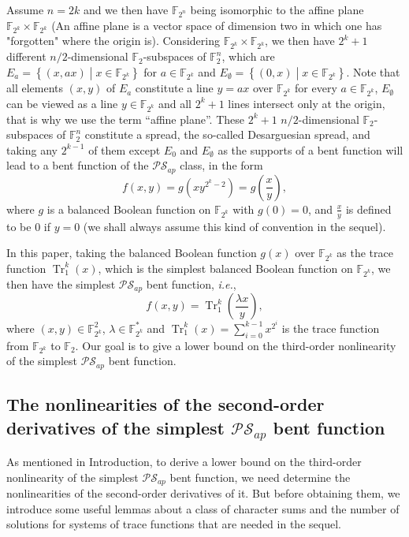 \documentclass{article}
\newcommand{\F}{\mathbb{F}}
\newcommand{\0}{\textbf{0}}
\newcommand{\1}{\textbf{1}}
\newcommand{\TRACE}{\operatorname{Tr}_1^k}
\theoremstyle{plain}
\begin{document}
    Assume $n=2k$ and we then have $\F_{2^n}$ being isomorphic to the affine plane $\F_{2^k}\times\F_{2^k}$ (An affine plane is a vector space of dimension two in which one has "forgotten" where the origin is).
    Considering $\F_{2^k}\times\F_{2^k}$, we then have $2^k+1$ different $n/2$-dimensional $\F_2$-subspaces of $\F_2^n$, which are $E_a=\left\{(x,ax)\middle| x\in\F_{2^k}\right\}$ for $a\in\F_{2^k}$ and $E_{\emptyset}=\left\{(0,x)\middle| x\in\F_{2^k}\right\}$. 
    Note that all elements $(x,y)$ of $E_a$ constitute a line $y=ax$ over $\F_{2^k}$ for every $a\in\F_{2^k}$, $E_{\emptyset}$ can be viewed as a line $y\in\F_{2^k}$ and all $2^k+1$ lines intersect only at the origin, that is why we use the term ``affine plane''. 
    These $2^k+1$ $n/2$-dimensional $\F_2$-subspaces of $\F_2^n$ constitute a spread, the so-called Desarguesian spread, and taking any $2^{k-1}$ of them except $E_0$ and $E_{\emptyset}$ as the supports of a bent function will lead to a bent function of the $\mathcal{PS}_{ap}$ class, in the form 
    \begin{equation*}\label{Eqn_PS_bent}
        f(x,y)=g\left(xy^{2^k-2}\right)=g\left(\frac{x}{y}\right),
    \end{equation*}
    where $g$ is a balanced Boolean function on $\F_{2^{k}}$ with $g(0)=0$, and $\frac{x}{y}$ is defined to be $0$ if $y=0$ (we shall always assume this kind of convention in the sequel).

    In this paper, taking the balanced Boolean function $g(x)$ over $\F_{2^k}$ as the trace function $\TRACE(x)$, which is the simplest balanced Boolean function on $\F_{2^k}$, we then have the simplest 
    $\mathcal{PS}_{ap}$ bent function, \emph{i.e.}, 
    \begin{equation*}\label{sub-bent}
        f(x,y)=\TRACE\left(\frac{\lambda x}{y}\right),
    \end{equation*}
    where $(x,y)\in\F_{2^k}^2$, $\lambda\in\F_{2^k}^{*}$ and $\TRACE(x)=\sum\limits_{i=0}^{k-1}x^{2^i}$ is the trace function from $\F_{2^k}$ to $\F_2$.
    Our goal is to give a lower bound on the third-order nonlinearity of the simplest $\mathcal{PS}_{ap}$ bent function. 

    \subsection{The nonlinearities of the second-order derivatives of the simplest $\mathcal{PS}_{ap}$ bent function}
    As mentioned in Introduction, to derive a lower bound on the third-order nonlinearity of the simplest $\mathcal{PS}_{ap}$ bent function, we need determine the nonlinearities of the second-order derivatives of it. 
    But before obtaining them, we introduce some useful lemmas about a class of character sums and the number of solutions for systems of trace functions that are needed in the sequel.
\end{document}
